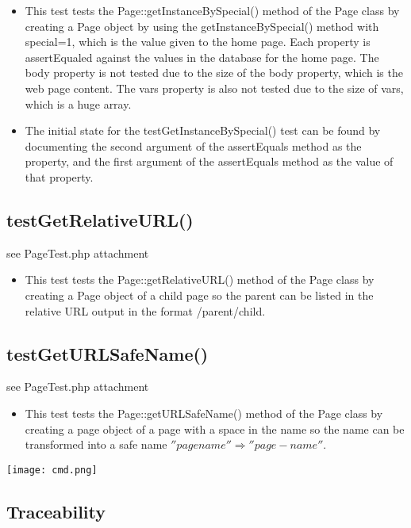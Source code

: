 \documentclass[12pt]{article}
\begin{document}
\begin{itemize}
\item This test tests the Page::getInstanceBySpecial() method of the Page class by creating a Page object by using the getInstanceBySpecial() method with special=1, which is the value given to the home page. Each property is assertEqualed against the values in the database for the home page. The body property is not tested due to the size of the body property, which is the web page content. The vars property is also not tested due to the size of vars, which is a huge array.
\item The initial state for the testGetInstanceBySpecial() test can be found by documenting the second argument of the assertEquals method as the property, and the first argument of the assertEquals method as the value of that property. 
\end{itemize}

\subsection{testGetRelativeURL()}

see PageTest.php attachment

\begin{itemize}
\item This test tests the Page::getRelativeURL() method of the Page class by creating a Page object of a child page so the parent can be listed in the relative URL output in the format /parent/child.
\end{itemize}


\subsection{testGetURLSafeName()}

see PageTest.php attachment

\begin{itemize}
\item This test tests the Page::getURLSafeName() method of the Page class by creating a page object of a page with a space in the name so the name can be transformed into a safe name $''page name''\Rightarrow''page-name''$.
\end{itemize}

\texttt{[image: cmd.png]}


\subsection{Traceability}
\end{document}
